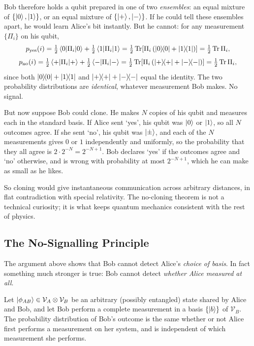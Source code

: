 \documentclass[a4paper]{scrartcl}
\newcommand{\Vs}{\mathcal{V}}
\begin{document}
Bob therefore holds a qubit prepared in one of two \emph{ensembles}: an equal mixture of $\{\ket{0},\ket{1}\}$, or an equal mixture of $\{\ket{+},\ket{-}\}$. If he could tell these ensembles apart, he would learn Alice's bit instantly. But he cannot: for any measurement $\{\Pi_i\}$ on his qubit,
$$p_{\text{yes}}(i) = \tfrac12\mel{0}{\Pi_i}{0} + \tfrac12\mel{1}{\Pi_i}{1} = \tfrac12\Tr\!\left[\Pi_i\left(\op{0}{0}+\op{1}{1}\right)\right] = \tfrac12 \Tr \Pi_i,$$
$$p_{\text{no}}(i) = \tfrac12\mel{+}{\Pi_i}{+} + \tfrac12\mel{-}{\Pi_i}{-} = \tfrac12\Tr\!\left[\Pi_i\left(\op{+}{+}+\op{-}{-}\right)\right] = \tfrac12\Tr\Pi_i,$$
since both $\op{0}{0}+\op{1}{1}$ and $\op{+}{+}+\op{-}{-}$ equal the identity. The two probability distributions are \emph{identical}, whatever measurement Bob makes. No signal.

But now suppose Bob could clone. He makes $N$ copies of his qubit and measures each in the standard basis. If Alice sent `yes', his qubit was $\ket{0}$ or $\ket{1}$, so all $N$ outcomes agree. If she sent `no', his qubit was $\ket{\pm}$, and each of the $N$ measurements gives $0$ or $1$ independently and uniformly, so the probability that they all agree is $2\cdot 2^{-N} = 2^{-N+1}$. Bob declares `yes' if the outcomes agree and `no' otherwise, and is wrong with probability at most $2^{-N+1}$, which he can make as small as he likes.

So cloning would give instantaneous communication across arbitrary distances, in flat contradiction with special relativity. The no-cloning theorem is not a technical curiosity; it is what keeps quantum mechanics consistent with the rest of physics.

\subsection{The No-Signalling Principle}\label{sec:nosignal}

The argument above shows that Bob cannot detect Alice's \emph{choice of basis}. In fact something much stronger is true: Bob cannot detect \emph{whether Alice measured at all}.

\begin{theorem}
	Let $\ket{\phi_{AB}} \in \Vs_A \otimes \Vs_B$ be an arbitrary (possibly entangled) state shared by Alice and Bob, and let Bob perform a complete measurement in a basis $\{\ket{b}\}$ of $\Vs_B$. The probability distribution of Bob's outcome is the same whether or not Alice first performs a measurement on her system, and is independent of which measurement she performs.
\end{theorem}
\end{document}

